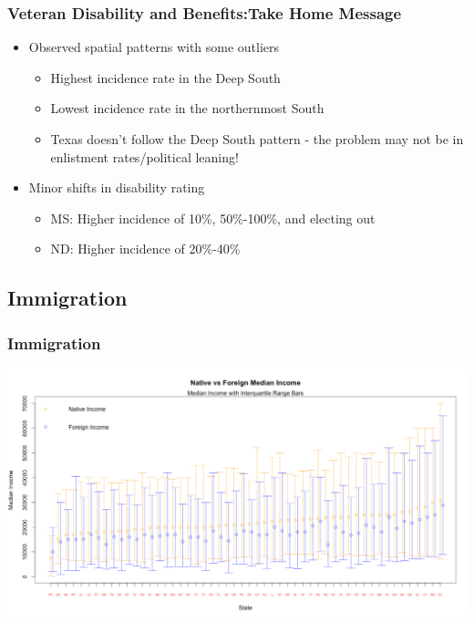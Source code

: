 \documentclass{beamer}
\begin{document}
\begin{frame}
\frametitle{Veteran Disability and Benefits:Take Home Message}
\begin{itemize}
\item Observed spatial patterns with some outliers
\begin{itemize}
\item Highest incidence rate in the Deep South
\item Lowest incidence rate in the northernmost South
\item Texas doesn't follow the Deep South pattern - the problem may not be in enlistment rates/political leaning!
  \end{itemize}
\item Minor shifts in disability rating
\begin{itemize}
\item MS: Higher incidence of 10\%, 50\%-100\%, and electing out
\item ND: Higher incidence of 20\%-40\%
  \end{itemize}
\end{itemize}

\end{frame}

\subsection{Immigration }
\begin{frame}
\frametitle{Immigration }
\begin{center} 
\includegraphics[width=1 \textwidth]{ImmIncome}

\end{center}


\end{frame}
\end{document}

